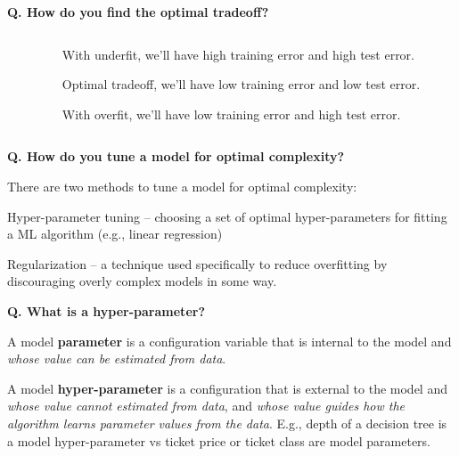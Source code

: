 \begin{frame}[fragile]{\textbf{Q. How do you find the optimal tradeoff?}}
\begin{columns}[T]
\begin{column}{.58\textwidth}
{{      }
    }
  \end{column}
  \hfill
  \begin{column}{.4\textwidth}
    \footnotesize
    \begin{wideitemize}\footnotesize
    \item<1-> With underfit, we'll have high training error and high test error.
    \item<2-> Optimal tradeoff, we'll have low training error and low test error.
    \item<3-> With overfit, we'll have low training error and high test error.
    \end{wideitemize}
    \end{column}
  \end{columns}
\end{frame}


\begin{frame}[fragile]{\textbf{Q. How do you tune a model for optimal complexity?}}
  \begin{wideitemize}
    \item There are two methods to tune a model for optimal complexity:\medskip
    \begin{wideitemize}
      \item Hyper-parameter tuning -- choosing a set of optimal hyper-parameters
      for fitting a ML algorithm (e.g., linear regression)
      \item Regularization -- a technique used specifically to reduce overfitting
      by discouraging overly complex models in some way.
    \end{wideitemize}
  \end{wideitemize}
\end{frame}

\begin{frame}[fragile]{\textbf{Q. What is a hyper-parameter?}}
  \begin{wideitemize}
    \item A model \textbf{parameter} is a configuration variable that
    is internal to the model and \textit{whose value can be estimated from data}.
    \item A model \textbf{hyper-parameter} is a configuration that is external
    to the model and \textit{whose value cannot estimated from data}, and
    \textit{whose value guides how the algorithm learns parameter values from
    the data}. E.g., depth of a decision tree is a model hyper-parameter vs
    ticket price or ticket class are model parameters.
  \end{wideitemize}
\end{frame}

